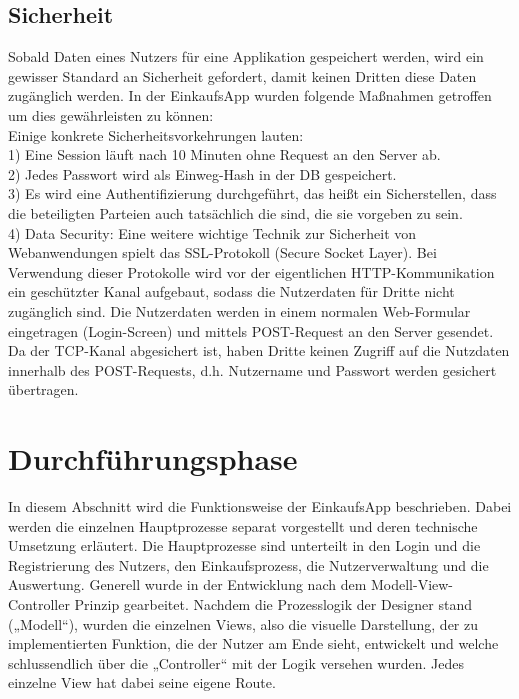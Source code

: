 \documentclass[12pt,a4paper]{article}
\begin{document}
\subsection{Sicherheit}
Sobald Daten eines Nutzers für eine Applikation gespeichert werden, wird ein gewisser Standard an Sicherheit gefordert, damit keinen Dritten diese Daten zugänglich werden.
In der EinkaufsApp wurden folgende Maßnahmen getroffen um dies gewährleisten zu können:
\\
Einige konkrete Sicherheitsvorkehrungen lauten:
\\
1)	Eine Session läuft nach 10 Minuten ohne Request an den Server ab.
\\
2)	Jedes Passwort wird als Einweg-Hash in der DB gespeichert.
\\
3)	Es wird eine Authentifizierung durchgeführt, das heißt ein Sicherstellen, dass die beteiligten Parteien auch tatsächlich die sind, die sie vorgeben zu sein.
\\
4)	Data Security: Eine weitere wichtige Technik zur Sicherheit von Webanwendungen spielt das SSL-Protokoll (Secure Socket Layer). Bei Verwendung dieser Protokolle wird vor der eigentlichen HTTP-Kommunikation ein geschützter Kanal aufgebaut, 
sodass die Nutzerdaten für Dritte nicht zugänglich sind. Die Nutzerdaten werden in einem normalen Web-Formular eingetragen (Login-Screen) und mittels POST-Request an den Server gesendet. Da der TCP-Kanal abgesichert ist, haben Dritte keinen Zugriff auf die 
Nutzdaten innerhalb des POST-Requests, d.h. Nutzername und Passwort werden gesichert übertragen.
\section{Durchführungsphase}

In diesem Abschnitt wird die Funktionsweise der EinkaufsApp beschrieben. Dabei werden die einzelnen Hauptprozesse separat vorgestellt und deren technische Umsetzung erläutert. Die Hauptprozesse sind unterteilt in den Login und die Registrierung des Nutzers, den Einkaufsprozess, die Nutzerverwaltung und die Auswertung. 
Generell wurde in der Entwicklung nach dem Modell-View-Controller Prinzip gearbeitet. Nachdem die Prozesslogik der Designer stand („Modell“), wurden die einzelnen Views, also die visuelle Darstellung, der zu implementierten Funktion, die der Nutzer am Ende sieht, entwickelt und welche schlussendlich über die „Controller“ mit der Logik versehen wurden. Jedes einzelne View hat dabei seine eigene Route.
\end{document}
